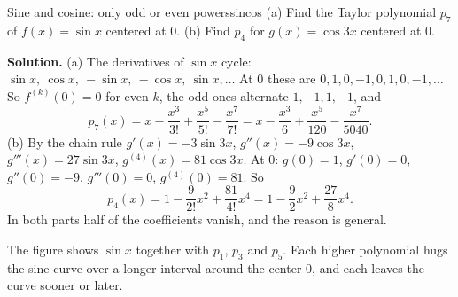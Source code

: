 \documentclass[11pt]{article}
\begin{document}
\begin{exmp}{Sine and cosine: only odd or even powers}{sincos}
(a) Find the Taylor polynomial $p_7$ of $f(x)=\sin x$ centered at $0$. (b) Find $p_4$ for $g(x)=\cos3x$ centered at $0$.

\textbf{Solution.} (a) The derivatives of $\sin x$ cycle: $\sin x,\ \cos x,\ -\sin x,\ -\cos x,\ \sin x,\dots$ At $0$ these are $0,1,0,-1,0,1,0,-1,\dots$ So $f^{(k)}(0)=0$ for even $k$, the odd ones alternate $1,-1,1,-1$, and
\[
p_7(x)=x-\frac{x^3}{3!}+\frac{x^5}{5!}-\frac{x^7}{7!}=x-\frac{x^3}6+\frac{x^5}{120}-\frac{x^7}{5040}.
\]
(b) By the chain rule $g'(x)=-3\sin3x$, $g''(x)=-9\cos3x$, $g'''(x)=27\sin3x$, $g^{(4)}(x)=81\cos3x$. At $0$: $g(0)=1$, $g'(0)=0$, $g''(0)=-9$, $g'''(0)=0$, $g^{(4)}(0)=81$. So
\[
p_4(x)=1-\frac{9}{2!}x^2+\frac{81}{4!}x^4=1-\frac92x^2+\frac{27}8x^4 .
\]
In both parts half of the coefficients vanish, and the reason is general.
\end{exmp}

\begin{center}
\end{center}

The figure shows $\sin x$ together with $p_1$, $p_3$ and $p_5$. Each higher polynomial hugs the sine curve over a longer interval around the center $0$, and each leaves the curve sooner or later.
\end{document}
